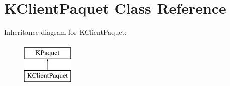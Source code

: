 \hypertarget{class_k_client_paquet}{\section{\-K\-Client\-Paquet \-Class \-Reference}
\label{class_k_client_paquet}
}
\-Inheritance diagram for \-K\-Client\-Paquet\-:\begin{figure}[H]
\begin{center}
\leavevmode
\includegraphics[height=2.000000cm]{class_k_client_paquet}
\end{center}
\end{figure}
